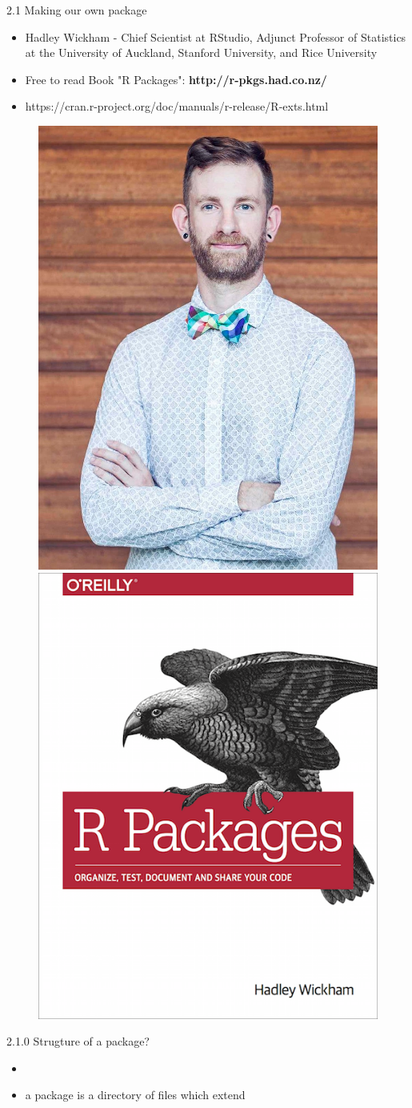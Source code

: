 \documentclass[11pt,a4paper]{beamer}
\begin{document}
\begin{frame}[t]{2.1 Making our own package}
	
	\begin{itemize}
		\item Hadley Wickham - Chief Scientist at RStudio, Adjunct Professor of Statistics at the University of Auckland, Stanford University, and Rice University
		\item Free to read Book "R Packages": \textbf{http://r-pkgs.had.co.nz/}
		\item https://cran.r-project.org/doc/manuals/r-release/R-exts.html
			
	\end{itemize}

	\begin{figure}
	\centering
	\includegraphics[width=0.3\linewidth]{hadley}
	\includegraphics[width=0.3\linewidth]{cover}
	\label{fig:packages}
	\end{figure}

	
\end{frame}











\begin{frame}[t]{2.1.0 Strugture of a package?}
	
	
	
	\begin{itemize}
		\item 
		\item a package is a directory of files which extend 
	
	
	\end{itemize}
	
\end{frame}
\end{document}
